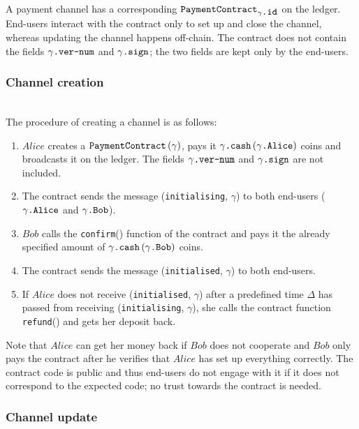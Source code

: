     A payment channel has a corresponding
    $\mbox{\texttt{PaymentContract}}_{\gamma\mbox{\texttt{.id}}}$ on the ledger. End-users
    interact with the contract only to set up and close the channel, whereas updating the
    channel happens off-chain. The contract does not contain the fields
    $\gamma\mbox{\texttt{.ver-num}}$ and $\gamma\mbox{\texttt{.sign}}$; the two fields are
    kept only by the end-users.

    \subsubsection{Channel creation} \ \\

    The procedure of creating a channel is as follows:
    \begin{enumerate}
      \item $Alice$ creates a $\mbox{\texttt{PaymentContract}}\left(\gamma\right)$, pays
      it $\gamma\mbox{\texttt{.cash}}\left(\gamma\mbox{\texttt{.Alice}}\right)$ coins and
      broadcasts it on the ledger. The fields $\gamma\mbox{\texttt{.ver-num}}$ and
      $\gamma\mbox{\texttt{.sign}}$ are not included.
      \item The contract sends the message (\texttt{initialising}, $\gamma$) to both
      end-users ($\gamma\mbox{\texttt{.Alice}}$ and $\gamma\mbox{\texttt{.Bob}}$).
      \item $Bob$ calls the \texttt{confirm}() function of the contract and pays it the
      already specified amount of
      $\gamma\mbox{\texttt{.cash}}\left(\gamma\mbox{\texttt{.Bob}}\right)$ coins.
      \item The contract sends the message (\texttt{initialised}, $\gamma$) to both
      end-users.
      \item If $Alice$ does not receive (\texttt{initialised}, $\gamma$) after a
      predefined time $\Delta$ has passed from receiving (\texttt{initialising},
      $\gamma$), she calls the contract function \texttt{refund}() and gets her deposit
      back.
    \end{enumerate}

    Note that $Alice$ can get her money back if $Bob$ does not cooperate and $Bob$ only
    pays the contract after he verifies that $Alice$ has set up everything correctly. The
    contract code is public and thus end-users do not engage with it if it does not
    correspond to the expected code; no trust towards the contract is needed.

    \subsubsection{Channel update} \ \\


